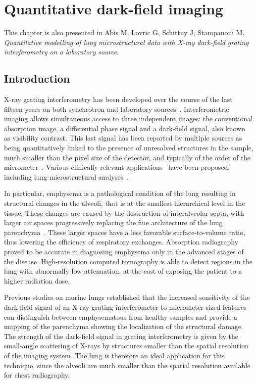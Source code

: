 \chapter{Quantitative dark-field imaging}\label{ch:lung-dark-field}
This chapter is also presented in Abis M, Lovric G, Schittny J, Stampanoni
M, \emph{Quantitative modelling of lung microstructural data with X-ray
dark-field grating interferometry on a laboratory source}.
\section{Introduction}\label{sec:introduction}
X-ray grating interferometry has been developed over the course of the last
  fifteen years on both synchrotron and laboratory
sources~\cite{David_2002,1347-4065-42-7B-L866,Weitkamp_2005,1347-4065-45-6R-5254,Pfeiffer2006}.
Interferometric imaging allows simultaneous access to three independent
images: the conventional absorption image, a differential phase signal and a
dark-field signal, also known as visibility contrast. This last signal has
been reported by multiple sources as being quantitatively linked to the
presence of unresolved structures in the sample, much smaller than the pixel
size of the detector, and typically of the order of the
micrometer~\cite{Pfeiffer2008,Lynch:11,Yashiro:10}. Various clinically
relevant applications~\cite{Wen_2009,Thilo2013} have been
proposed, including lung microstructural analyses~\cite{Schleede17880,Meinel_2014,Meinel_2013,Yaroshenko_2013}.

In particular, emphysema is a pathological condition of the lung
resulting in structural changes in the alveoli, that is at the smallest
hierarchical level in the tissue. These changes are caused by the
destruction of interalveolar septa, with larger air spaces progressively
replacing the fine architecture of the lung
parenchyma~\cite{Sharafkhaneh_2008}. These larger spaces have a less
favorable surface-to-volume ratio, thus lowering the efficiency
of respiratory exchanges. Absorption radiography proved to be accurate in
diagnosing emphysema only in the advanced stages of the disease. 
High-resolution computed tomography is able to detect regions in the lung
with abnormally low attenuation, at the cost of exposing the patient
to a higher radiation dose.

Previous studies on murine lungs established that the increased sensitivity of
the dark-field signal of an X-ray grating interferometer to micrometer-sized
features can distinguish between emphysematous from healthy samples and
provide a mapping of the parenchyma showing the localization of the
structural damage.
The strength of the dark-field signal in grating interferometry is
given by the small-angle scattering of X-rays by structures smaller than the
spatial resolution of the imaging system. The lung is therefore an ideal
application for this technique, since the alveoli are much
smaller than the spatial resolution available for chest radiography.

